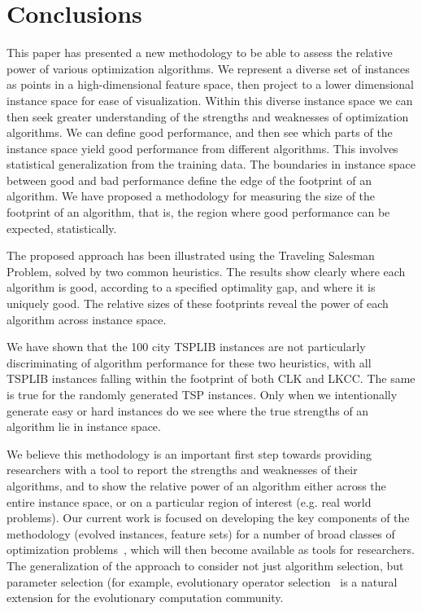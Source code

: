 \documentclass[conference]{IEEEtran}
\begin{document}
\section{Conclusions} \label{sec:Conclusion}
This paper has presented a new methodology to be able to assess the relative power of various optimization algorithms. We represent a diverse set of instances as points in a high-dimensional feature space, then project to a lower dimensional instance space for ease of visualization. Within this diverse instance space we can then seek greater understanding of the strengths and weaknesses of optimization algorithms. We can define good performance, and then see which parts of the instance space yield good performance from different algorithms. This involves statistical generalization from the training data. The boundaries in instance space between good and bad performance define the edge of the footprint of an algorithm. We have proposed a methodology for measuring the size of the footprint of an algorithm, that is, the region where good performance can be expected, statistically.

The proposed approach has been illustrated using the Traveling Salesman Problem, solved by two common heuristics. The results show clearly where each algorithm is good, according to a specified optimality gap, and where it is uniquely good. The relative sizes of these footprints reveal the power of each algorithm across instance space.

We have shown that the 100 city TSPLIB instances are not particularly discriminating of algorithm performance for these two heuristics, with all TSPLIB instances falling within the footprint of both CLK and LKCC. The same is true for the randomly generated TSP instances. Only when we intentionally generate easy or hard instances do we see where the true strengths of an algorithm lie in instance space.

We believe this methodology is an important first step towards providing researchers with a tool to report the strengths and weaknesses of their algorithms, and to show the relative power of an algorithm either across the entire instance space, or on a particular region of interest (e.g. real world problems). Our current work is focused on developing the key components of the methodology (evolved instances, feature sets) for a number of broad classes of optimization problems~\cite{CAOR}, which will then become available as tools for researchers. The generalization of the approach to consider not just algorithm selection, but parameter selection (for example, evolutionary operator selection~\cite{EvolvingSearchSpaces} is a natural extension for the evolutionary computation community.
\end{document}
